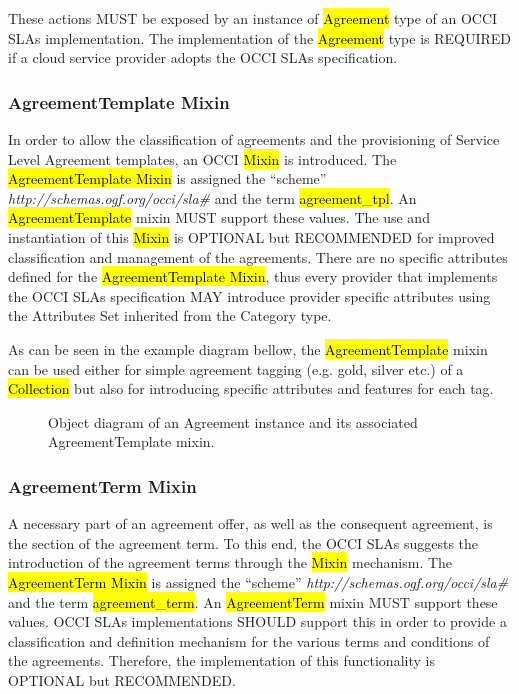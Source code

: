 \documentclass[10pt,a4paper]{article}
\begin{document}
These actions MUST be exposed by an instance of \hl{Agreement} type of an OCCI SLAs implementation. The implementation of the \hl{Agreement} type is REQUIRED if a cloud service provider adopts the OCCI SLAs specification. 


\subsubsection{AgreementTemplate Mixin}
In order to allow the classification of agreements and the provisioning of Service Level Agreement templates, an OCCI \hl{Mixin} is introduced. The \hl{AgreementTemplate Mixin} is assigned the “scheme” \textit{http://schemas.ogf.org/occi/sla\#} and the term \hl{agreement\_tpl}. An \hl{AgreementTemplate} mixin MUST support these values. The use and instantiation of this \hl{Mixin} is OPTIONAL but RECOMMENDED for improved classification and management of the agreements.  There are no specific attributes defined for the \hl{AgreementTemplate Mixin}, thus every provider that implements the OCCI SLAs specification MAY introduce provider specific attributes using the Attributes Set inherited from the Category type. 

As can be seen in the example diagram bellow, the \hl{AgreementTemplate} mixin can be used either for simple agreement tagging (e.g. gold, silver etc.) of a \hl{Collection} but also for introducing specific attributes and features for each tag.  

\begin{figure}[!h]
	{\centering {} \par}
	\caption{Object diagram of an Agreement instance and its associated AgreementTemplate mixin.}
	\label{fig:template-example}
\end{figure}

\subsubsection{AgreementTerm Mixin}
A necessary part of an agreement offer, as well as the consequent agreement, is the section of the agreement term. To this end, the OCCI SLAs suggests the introduction of the agreement terms through the \hl{Mixin} mechanism. The \hl{AgreementTerm Mixin} is assigned the “scheme” \textit{http://schemas.ogf.org/occi/sla\#} and the term \hl{agreement\_term}. An \hl{AgreementTerm} mixin MUST support these values. OCCI SLAs implementations SHOULD support this in order to provide a classification and definition mechanism for the various terms and conditions of the agreements. Therefore, the implementation of this functionality is OPTIONAL but RECOMMENDED. 
\end{document}
